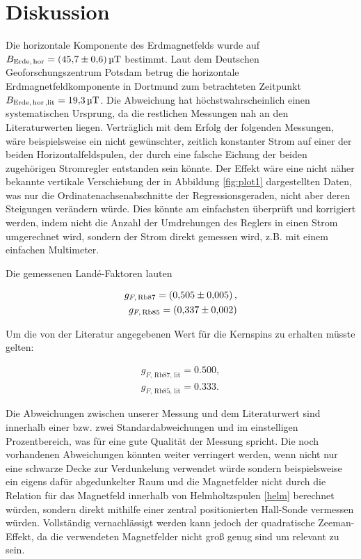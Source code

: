 \section{Diskussion}
\label{sec:Diskussion}

Die horizontale Komponente des Erdmagnetfelds wurde auf $B_\text{Erde,\,hor} = \SI{45.7\pm 0.6}{\micro \tesla}$ bestimmt. Laut dem Deutschen Geoforschungszentrum Potsdam \cite{mag} betrug die horizontale Erdmagnetfeldkomponente in Dortmund zum betrachteten Zeitpunkt $B_\text{Erde,\,hor\,,lit} = \SI{19.3}{\micro \tesla}$. Die Abweichung hat höchstwahrscheinlich einen systematischen Ursprung, da die restlichen Messungen nah an den Literaturwerten liegen. Verträglich mit dem Erfolg der folgenden Messungen, wäre beispielsweise ein nicht gewünschter, zeitlich konstanter Strom auf einer der beiden Horizontalfeldspulen, der durch eine falsche Eichung der beiden zugehörigen Stromregler entstanden sein könnte. Der Effekt wäre eine nicht näher bekannte vertikale Verschiebung der in Abbildung \ref{fig:plot1} dargestellten Daten, was nur die Ordinatenachsenabschnitte der Regressionsgeraden, nicht aber deren Steigungen verändern würde. Dies könnte am einfachsten überprüft und korrigiert werden, indem nicht die Anzahl der Umdrehungen des Reglers in einen Strom umgerechnet wird, sondern der Strom direkt gemessen wird, z.B. mit einem einfachen Multimeter.

Die gemessenen Landé-Faktoren lauten

\begin{eqnarray}
	g_{F,\, \text{Rb}87} = \SI{0.505 \pm 0.005},\\
	g_{F,\, \text{Rb}85} = \SI{0.337 \pm 0.002}.
\end{eqnarray}

Um die von der Literatur \cite{Rb} angegebenen Wert für die Kernspins zu erhalten müsste gelten:

\begin{eqnarray}
g_{F,\, \text{Rb}87, \, \text{lit}} = \SI{0.500},\\
g_{F,\, \text{Rb}85, \, \text{lit}} = \SI{0.333}.
\end{eqnarray}

Die Abweichungen zwischen unserer Messung und dem Literaturwert sind innerhalb einer bzw. zwei Standardabweichungen und im einstelligen Prozentbereich, was für eine gute Qualität der Messung spricht. Die noch vorhandenen Abweichungen könnten weiter verringert werden, wenn nicht nur eine schwarze Decke zur Verdunkelung verwendet würde sondern beispielsweise ein eigens dafür abgedunkelter Raum und die Magnetfelder nicht durch die Relation für das Magnetfeld innerhalb von Helmholtzspulen \eqref{helm} berechnet würden, sondern direkt mithilfe einer zentral positionierten Hall-Sonde vermessen würden. Vollständig vernachlässigt werden kann jedoch der quadratische Zeeman-Effekt, da die verwendeten Magnetfelder nicht groß genug sind um relevant zu sein. 

